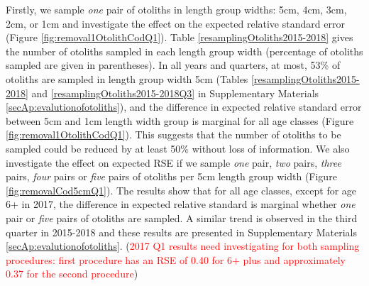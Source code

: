 \documentclass[a4paper 12pt]{article}
\numberwithin{equation}{section}
\newcommand{\ed}[1]{\textcolor{red}{#1}}
\begin{document}
Firstly, we sample \textit{one} pair of otoliths in length group widths: 5cm, 4cm, 3cm, 2cm, or 1cm and investigate the effect on the expected relative standard error (Figure \ref{fig:removal1OtolithCodQ1}). Table \ref{resamplingOtoliths2015-2018} gives the number of otoliths sampled in each length group width (percentage of otoliths sampled are given in parentheses). In all years and quarters, at most, 53\% of otoliths are sampled in length group width 5cm (Tables \ref{resamplingOtoliths2015-2018} and \ref{resamplingOtoliths2015-2018Q3} in Supplementary Materials \ref{secAp:evalutionofotoliths}), and the difference in expected relative standard error between 5cm and 1cm length width group is marginal for all age classes (Figure \ref{fig:removal1OtolithCodQ1}). This suggests that the number of otoliths to be sampled could be reduced by at least 50\% without loss of information. We also investigate the effect on expected RSE if we sample \textit{one} pair, \textit{two} pairs, \textit{three} pairs, \textit{four} pairs  or \textit{five} pairs of otoliths per 5cm length group width (Figure  \ref{fig:removalCod5cmQ1}). The results show that for all age classes, except for age 6+ in 2017, the difference in expected relative standard is marginal whether \textit{one} pair or \textit{five} pairs of otoliths are sampled. A similar trend is observed in the third quarter in 2015-2018 and these results are presented  in Supplementary Materials \ref{secAp:evalutionofotoliths}. (\ed{2017 Q1 results need investigating for both sampling procedures: first procedure has an RSE of 0.40 for 6+ plus and approximately 0.37 for the second procedure}) \\
\end{document}
